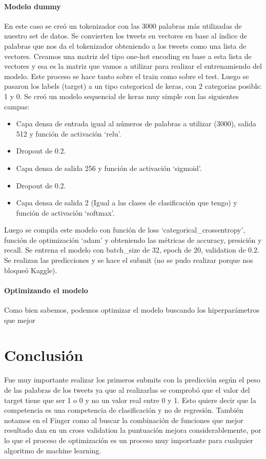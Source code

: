 \documentclass[12pt]{article}
\begin{document}
\paragraph{Modelo dummy\\}
En este caso se creó un tokenizador con las 3000 palabras más utilizadas de nuestro set de datos.
Se convierten los tweets en vectores en base al índice de palabras que nos da el tokenizador obteniendo a los tweets como una lista de vectores.
Creamos una matriz del tipo one-hot encoding en base a esta lista de vectores y esa es la matriz que vamos a utilizar para realizar el entrenamiendo del modelo. Este proceso se hace tanto sobre el train como sobre el test.
Luego se pasaron los labels (target) a un tipo categorical de keras, con 2 categorias posibls: 1 y 0.
Se creó un modelo sequencial de keras muy simple con las siguientes campas:
\begin{itemize}
  \item Capa densa de entrada igual al números de palabras a utilizar (3000), salida 512 y función de activación ‘relu’.
  \item Dropout de 0.2.
  \item Capa densa de salida 256 y función de activación ‘sigmoid’.
  \item Dropout de 0.2.
  \item Capa densa de salida 2 (Igual a las clases de clasificación que tengo) y función de activación ‘softmax’.
\end{itemize}
Luego se compila este modelo con función de loss ‘categorical\_crossentropy’, función de optimización ‘adam’ y obteniendo las métricas de accuracy, presición y recall.
Se entrena el modelo con batch\_size de 32, epoch de 20, validation de 0.2.
Se realizan las predicciones y se hace el submit (no se pudo realizar porque nos bloqueó Kaggle).


\paragraph{Optimizando el modelo\\}
Como bien sabemos, podemos optimizar el modelo buscando los hiperparámetros que mejor 


\newpage
\section{Conclusión}
Fue muy importante realizar los primeros submits con la predicción según el peso de las palabras de los tweets ya que al realizarlas se comprobó que el valor del target tiene que ser 1 o 0 y no un valor real entre 0 y 1. Esto quiere decir que la competencia es una competencia de clasificación y no de regresión.
También notamos en el Finger como al buscar la combinación de funciones que mejor resultado dan en un cross validation la puntuación mejora considerablemente, por lo que el proceso de optimización es un proceso muy importante para cualquier algoritmo de machine learning.
\end{document}
